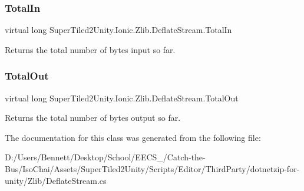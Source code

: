 \subsubsection{\texorpdfstring{Total\+In}{TotalIn}}
{\footnotesize\ttfamily virtual long Super\+Tiled2\+Unity.\+Ionic.\+Zlib.\+Deflate\+Stream.\+Total\+In\hspace{0.3cm}{\ttfamily [get]}}



Returns the total number of bytes input so far.

\mbox{\label{class_super_tiled2_unity_1_1_ionic_1_1_zlib_1_1_deflate_stream_a0250472e27d63a58912c49c495b7d367}} 
\subsubsection{\texorpdfstring{Total\+Out}{TotalOut}}
{\footnotesize\ttfamily virtual long Super\+Tiled2\+Unity.\+Ionic.\+Zlib.\+Deflate\+Stream.\+Total\+Out\hspace{0.3cm}{\ttfamily [get]}}



Returns the total number of bytes output so far.



The documentation for this class was generated from the following file\+:\begin{DoxyCompactItemize}
\item 
D\+:/\+Users/\+Bennett/\+Desktop/\+School/\+E\+E\+C\+S\+\_/\+Catch-\/the-\/\+Bus/\+Iso\+Chai/\+Assets/\+Super\+Tiled2\+Unity/\+Scripts/\+Editor/\+Third\+Party/dotnetzip-\/for-\/unity/\+Zlib/Deflate\+Stream.\+cs\end{DoxyCompactItemize}
